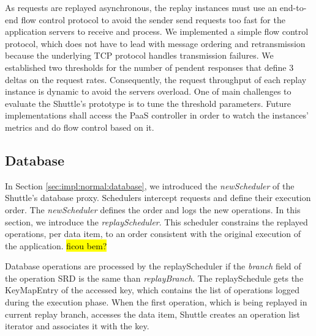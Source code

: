 


As requests are replayed asynchronous, the replay instances must use an end-to-end flow control protocol to avoid the sender send requests too fast for the application servers to receive and process. We implemented a simple flow control protocol, which does not have to lead with message ordering and retransmission because the underlying \ac{TCP} protocol handles transmission failures. We established two thresholds for the number of pendent responses that define 3 deltas on the request rates. Consequently, the request throughput of each replay instance is dynamic to avoid the servers overload. One of main challenges to evaluate the Shuttle's prototype is to tune the threshold parameters. Future implementations shall access the \ac{PaaS} controller in order to watch the instances' metrics and do flow control based on it.\\


\subsection{Database}\label{sec:impl:recovery:database}
In Section \ref{sec:impl:normal:database}, we introduced the \emph{newScheduler} of the Shuttle's database proxy. Schedulers intercept requests and define their execution order. The \emph{newScheduler} defines the order and logs the new operations. In this section, we introduce the \emph{replayScheduler}. This scheduler constrains the replayed operations, per data item, to an order consistent with the original execution of the application. \hl{ficou bem?}

Database operations are processed by the replayScheduler if the \emph{branch} field of the operation \ac{SRD} is the same than \emph{replayBranch}. The replaySchedule gets the KeyMapEntry of the accessed key, which contains the list of operations logged during the execution phase. When the first operation, which is being replayed in current replay branch, accesses the data item, Shuttle creates an operation list iterator and associates it with the key.

